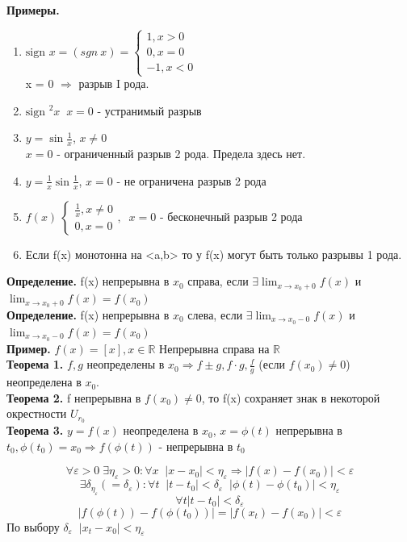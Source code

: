 \documentclass[12pt, a4paper]{article}
\newcommand{\R}{\mathbb{R}}
\newcommand{\eps}{\varepsilon}
\newcommand{\sign}{\text{sign\ }}
\begin{document}
\textbf{Примеры.}
\begin{enumerate}
	\item $\sign x = (sgn\ x) = \begin{cases}
		1, x > 0\\
		0,x=0\\
		-1,x<0
	\end{cases}$\\
	x = 0 $\Rightarrow$ разрыв I рода. 
	\item $\sign ^2 x \;\; x = 0$ - устранимый разрыв
	\item $y = \sin \frac{1}{x}$, $x\not= 0 $\\
		$x = 0$ - ограниченный разрыв 2 рода. Предела здесь нет. 
	\item $y = \frac{1}{x} \sin \frac{1}{x}$, $x = 0$ - не ограничена разрыв 2 рода
	\item $f(x) \ \begin{cases}
		\frac{1}{x}, x\not=0\\
		0,x=0 
	\end{cases},\;\; x=0$ - бесконечный разрыв 2 рода
	\item Если f(x) монотонна на <a,b> то у f(x) могут быть только разрывы 1 рода. 
\end{enumerate}
\textbf{Определение.} f(x) непрерывна в $x_0$ справа, если $\exists \lim_{x \to x_0 + 0} f(x)$ и $\lim_{x \to x_0  + 0} f(x) = f(x_0)$\\
\textbf{Определение.} f(x) непрерывна в $x_0$ слева, если $\exists \lim_{x \to x_0 - 0} f(x)$ и $\lim_{x \to x_0  - 0} f(x) = f(x_0)$\\
\textbf{Пример.} $f(x) = [x], x \in \R$
Непрерывна справа на $\R$ \\
\textbf{Теорема 1.} $f, g$ неопределены в $x_0 \Rightarrow f \pm g, f \cdot g, \frac{f}{g}$ (если $f(x_0) \not=0$) неопределена в $x_0$. \\
\textbf{Теорема 2.} f непрерывна в $f(x_0) \not= 0$, то f(x) сохраняет знак в некоторой окрестности $U_{r_0}$\\
\textbf{Теорема 3.} $y = f(x)$ неопределена в $x_0$, $x = \phi(t)$ непрерывна в $t_0, \phi(t_0) = x_0 \Rightarrow f(\phi(t))$ - непрерывна в $t_0$
\begin{tcolorbox}[title=Доказательство]
	\[ \forall \eps > 0\; \exists \eta_\eps > 0: \forall x \;\; |x - x_0| < \eta_\eps  \Rightarrow |f(x) - f(x_0)| < \eps  \]
	\[ \exists \delta_{\eta_\eps} (=\delta_\eps): \forall t \;\; |t - t_0| < \delta_\eps \;\; |\phi(t) - \phi(t_0)| < \eta_\eps \]
	\[ \forall t |t - t_0| < \delta_\eps \]
	\[ |f(\phi(t)) - f(\phi(t_0)) | = |f(x_t) - f(x_0)| < \eps \]
	По выбору $\delta_\eps \;\; |x_t -  x_0| < \eta_\eps $
\end{tcolorbox}
\end{document}

